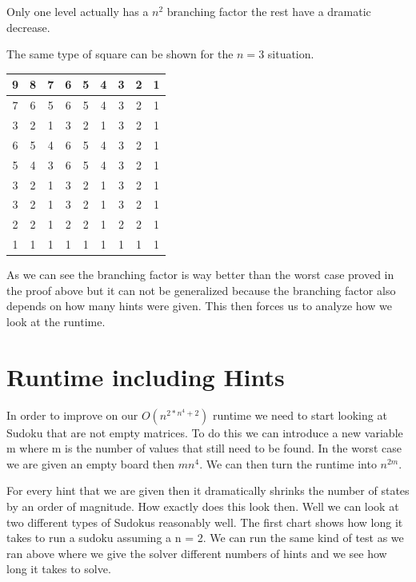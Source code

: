 \documentclass{sig-alternate}
\begin{document}
Only one level actually has a $n^2$ branching factor the rest have a dramatic decrease. 

The same type of square can be shown for the $n = 3$ situation. 

\begin{center}
  \begin{tabular}{ | c | c | c | c | c | c | c | c | c |}
    \hline
    	9 & 8 & 7 & 6 & 5 & 4 & 3 & 2 & 1 \\ \hline
        7 & 6 & 5 & 6 & 5 & 4 & 3 & 2 & 1 \\ \hline
        3 & 2 & 1 & 3 & 2 & 1 & 3 & 2 & 1 \\ \hline
        6 & 5 & 4 & 6 & 5 & 4 & 3 & 2 & 1 \\ \hline
        5 & 4 & 3 & 6 & 5 & 4 & 3 & 2 & 1 \\ \hline
        3 & 2 & 1 & 3 & 2 & 1 & 3 & 2 & 1 \\ \hline
        3 & 2 & 1 & 3 & 2 & 1 & 3 & 2 & 1 \\ \hline
        2 & 2 & 1 & 2 & 2 & 1 & 2 & 2 & 1 \\ \hline
        1 & 1 & 1 & 1 & 1 & 1 & 1 & 1 & 1 \\ 
    \hline
  \end{tabular}
\end{center}

As we can see the branching factor is way better than the worst case proved in the proof above but it can not be generalized because the branching factor also depends on how many hints were given. This then forces us to analyze how we look at the runtime. 

\section{Runtime including Hints}
In order to improve on our $O(n^{2*n^4 + 2})$ runtime we need to start looking at Sudoku that are not empty matrices. To do this we can introduce a new variable m where m is the number of values that still need to be found. In the worst case we are given an empty board then $ m  n^4$. We can then turn the runtime into $n^{2m}$. 

For every hint that we are given then it dramatically shrinks the number of states by an order of magnitude. How exactly does this look then. Well we can look at two different types of Sudokus reasonably well.
The first chart shows how long it takes to run a sudoku assuming a n = 2. We can run the same kind of test as we ran above where we give the solver different numbers of hints and we see how long it takes to solve. 
\end{document}
